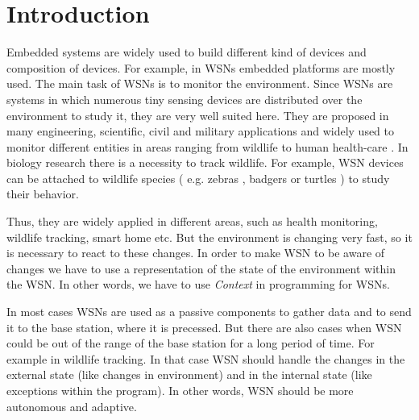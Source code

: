 \documentclass{ubicomp-ext}
\begin{document}
\begin{abstract}

\end{abstract}
\section{Introduction}
Embedded systems are widely used to build different kind of devices and composition of devices. For example, in WSNs embedded platforms are mostly used. The main task of WSNs is to monitor the environment. Since WSNs are systems in which numerous tiny sensing devices are distributed over the environment to study it, they are very well suited here. They are proposed in many engineering, scientific,  civil and military applications and widely used to monitor different entities in areas ranging from wildlife \cite{juang02} \cite{lingren08} \cite{pastor08} to human health-care \cite{lorincz09} \cite{alemdar10}. In biology research there is a necessity to track wildlife. For example, WSN devices can be attached to wildlife species ( e.g. zebras \cite{juang02}, badgers \cite{dyo09} or turtles \cite{gorlick07}) to study their behavior.

 Thus, they are widely applied in different areas, such as health monitoring, wildlife tracking, smart home etc. But the environment is changing very fast, so it is necessary to react to these changes. In order to make WSN to be aware of changes we have to use a representation of the state of the environment within the WSN. In other words, we have to use \textit{Context} in programming for WSNs.

In most cases WSNs are used as a passive components to gather data and to send it to the base station, where it is precessed. But there are also cases when WSN could be out of the range of the base station for a long period of time. For example in wildlife tracking. In that case WSN should handle the changes in the external state (like changes in environment) and in the internal state (like exceptions within the program). In other words, WSN should be more autonomous and adaptive.
\end{document}

